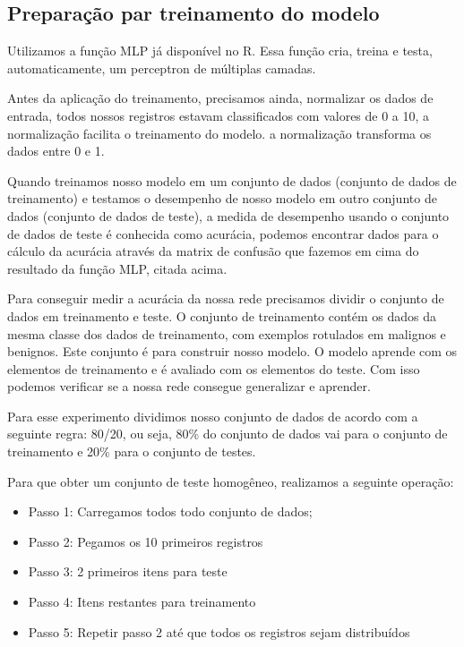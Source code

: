 \documentclass[conference]{IEEEtran}
\begin{document}
\subsection{Preparação par treinamento do modelo}
     Utilizamos a função MLP já disponível no R. Essa função cria, treina e testa, automaticamente, um perceptron de múltiplas camadas. 
     
     Antes da aplicação do treinamento, precisamos ainda, normalizar os dados de entrada, todos nossos registros estavam classificados com valores de 0 a 10, a normalização facilita o treinamento do modelo. a normalização transforma os dados entre 0 e 1.
     
     Quando treinamos nosso modelo em um conjunto de dados (conjunto de dados de treinamento) e testamos o desempenho de nosso modelo em outro conjunto de dados (conjunto de dados de teste), a medida de desempenho usando o conjunto de dados de teste é conhecida como acurácia, podemos encontrar dados para o cálculo da acurácia através da matrix de confusão que fazemos em cima do resultado da função MLP, citada acima.
    
    Para conseguir medir a acurácia da nossa rede precisamos dividir o conjunto de dados em treinamento e teste. O conjunto de treinamento contém os dados da mesma classe dos dados de treinamento, com exemplos rotulados em malignos e benignos. Este conjunto é para construir nosso modelo. O modelo aprende com os elementos de treinamento e é avaliado com os elementos do teste. Com isso podemos verificar se a nossa rede consegue generalizar e aprender.
    
    Para esse experimento dividimos nosso conjunto de dados de acordo com a seguinte regra: 80/20, ou seja, 80\% do conjunto de dados vai para o conjunto de treinamento e 20\% para o conjunto de testes. 
    
    Para que obter um conjunto de teste homogêneo, realizamos a seguinte operação:
    
    \begin{itemize}
    
    \item Passo 1: Carregamos todos todo conjunto de dados;
    \item Passo 2: Pegamos os 10 primeiros registros
    \item Passo 3: 2 primeiros itens para teste
    \item Passo 4: Itens restantes para treinamento
    \item Passo 5: Repetir passo 2 até que todos os registros sejam distribuídos
    
    \end{itemize}
    
\end{document}
